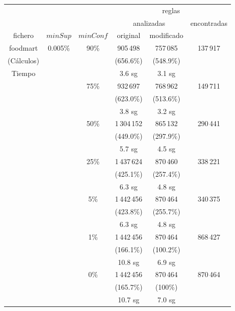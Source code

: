 \begin{table}[htb]
   \begin{center}
   \scriptsize
      \begin{tabular}{cccccc} \hline
                      &          &           & \multicolumn{3}{c}{reglas} \\ \cline{4-6}
                      &          &           & \multicolumn{2}{c}{analizadas} & encontradas \\ \cline{4-5}
         fichero      & $minSup$ & $minConf$ & original    & modificado & \\ \cline{1-1}\cline{2-2}\cline{3-3} \cline{4-4}\cline{5-5} \cline{6-6}
         foodmart     & 0.005\%  & 90\%      & 905\,498    & 757\,085   & 137\,917 \\
         (Cálculos)   &          &           & (656.6\%)   & (548.9\%)  & \\
         {Tiempo}&          &           & {3.6 sg}      & {3.1 sg}     & \\
                      &          & 75\%      & 932\,697    & 768\,962   & 149\,711 \\
                      &          &           & (623.0\%)   & (513.6\%)  & \\
                      &          &           & {3.8 sg}      & {3.2 sg}     & \\
                      &          & 50\%      & 1\,304\,152 & 865\,132   & 290\,441 \\
                      &          &           & (449.0\%)   & (297.9\%)  & \\
                      &          &           & {5.7 sg}      & {4.5 sg}     & \\
                      &          & 25\%      & 1\,437\,624 & 870\,460   & 338\,221 \\
                      &          &           & (425.1\%)   & (257.4\%)  & \\
                      &          &           & {6.3 sg}      & {4.8 sg}     & \\
                      &          & 5\%       & 1\,442\,456 & 870\,464   & 340\,375 \\
                      &          &           & (423.8\%)   & (255.7\%)  & \\
                      &          &           & {6.3 sg}      & {4.8 sg}     & \\
                      &          & 1\%       & 1\,442\,456 & 870\,464   & 868\,427 \\
                      &          &           & (166.1\%)   & (100.2\%)  & \\
                      &          &           & {10.8 sg}     & {6.9 sg}     & \\
                      &          & 0\%       & 1\,442\,456 & 870\,464   & 870\,464 \\
                      &          &           & (165.7\%)   & (100\%)    & \\
                      &          &           & {10.7 sg}     & {7.0 sg}     & \\ \hline
      \end{tabular}
   \end{center}


\end{table}
